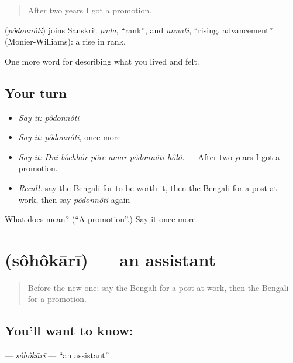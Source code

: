 \begin{quote}
After two years I got a promotion.
\end{quote}

\begin{cousinweb}
\textbf{} (\emph{pôdonnôti}) joins Sanskrit \emph{pada}, \textquotedblleft{}rank\textquotedblright{}, and \emph{unnati}, \textquotedblleft{}rising, advancement\textquotedblright{} (Monier-Williams): a rise in rank.
\end{cousinweb}

\begin{grammarlens}[title={What you've built}]
One more word for describing what you lived and felt.
\end{grammarlens}

\subsection*{Your turn}
\begin{itemize}
\raggedright
  \item \emph{Say it:} \emph{pôdonnôti}
  \item \emph{Say it:} \emph{pôdonnôti}, once more
  \item \emph{Say it:} \emph{Dui bôchhôr pôre āmār pôdonnôti hôlô.} — After two years I got a promotion.
  \item \emph{Recall:} say the Bengali for to be worth it, then the Bengali for a post at work, then say \emph{pôdonnôti} again
\end{itemize}

\begin{tcolorbox}[breakable,colback=teal!4,colframe=teal!35!black,title={Before you move on}]
What does  mean? (\textquotedblleft{}A promotion\textquotedblright{}.) Say it once more.
\end{tcolorbox}
\section[\texorpdfstring{\bn{সহকারী} (sôhôkārī)}{সহকারী (sôhôkārī)}]{ (sôhôkārī) — an assistant}

\label{lesson:BN-C496-sohokari}



\begin{quote}
Before the new one: say the Bengali for a post at work, then the Bengali for a promotion.
\end{quote}

\subsection*{You'll want to know: }
\textbf{} — \emph{sôhôkārī} — \textquotedblleft{}an assistant\textquotedblright{}.


